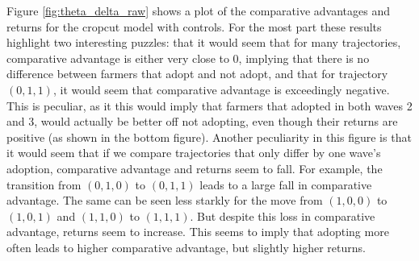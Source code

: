 \documentclass[11pt]{article}
\begin{document}



%     
%     
%     
%     


Figure \ref{fig:theta_delta_raw} shows a plot of the comparative advantages and returns for the cropcut model with controls. For the most part these results highlight two interesting puzzles: that it would seem that for many trajectories, comparative advantage is either very close to 0, implying that there is no difference between farmers that adopt and not adopt, and that for trajectory $(0,1,1)$, it would seem that comparative advantage is exceedingly negative. This is peculiar, as it this would imply that farmers that adopted in both waves 2 and 3, would actually be better off not adopting, even though their returns are positive (as shown in the bottom figure). Another peculiarity in this figure is that it would seem that if we compare trajectories that only differ by one wave's adoption, comparative advantage and returns seem to fall. For example, the transition from $(0,1,0)$ to $(0,1,1)$ leads to a large fall in comparative advantage. The same can be seen less starkly for the move from $(1,0,0)$ to $(1,0,1)$ and $(1,1,0)$ to $(1,1,1)$. But despite this loss in comparative advantage, returns seem to increase. This seems to imply that adopting more often leads to higher comparative advantage, but slightly higher returns. 
\end{document}
